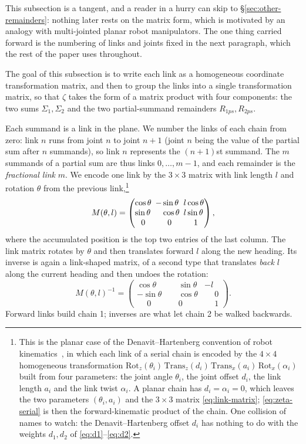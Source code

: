 \documentclass[11pt]{article}
\makeatletter
\theoremstyle{definition}
\newcommand{\linkmat}[2]{%
\left(\begin{array}{@{}l@{\ \,}l@{\ \,}l@{}}
\cos #1 & -\sin #1           & #2\cos #1\\
\sin #1 & \phantom{-}\cos #1 & #2\sin #1\\
\multicolumn{1}{@{}c@{\ \,}}{0} & \multicolumn{1}{c@{\ \,}}{0} & \multicolumn{1}{c@{}}{1}
\end{array}\right)}
\makeatother
\begin{document}
This subsection is a tangent, and a reader in a hurry can skip to
\S\ref{sec:other-remainders}: nothing later rests on the matrix form, which is
motivated by an analogy with multi-jointed planar robot manipulators. The one
thing carried forward is the numbering of links and joints fixed in the next
paragraph, which the rest of the paper uses throughout.

The goal of this subsection is to write each link
as a homogeneous coordinate transformation matrix, and then to group the
links into a single transformation matrix, so that $\zeta$ takes the form
of a matrix product with four components: the two sums $\Sigma_1,\Sigma_2$
and the two partial-summand remainders $R_{1ps},R_{2ps}$.

Each summand is a link in the plane. We number the
links of each chain from zero: link $n$ runs from joint $n$ to joint $n+1$
(joint $n$ being the value of the partial sum after $n$ summands), so link $n$
represents the $(n+1)$st summand. The $m$ summands of a partial sum are thus
links $0,\dots,m-1$, and each remainder is the \emph{fractional link} $m$. We
encode one link by the $3\times3$ matrix with link length $l$ and rotation
$\theta$ from the previous link,\footnote{This is the planar case of the
Denavit--Hartenberg convention of robot kinematics~\cite{DenavitHartenberg1955},
in which each link of a serial chain is encoded by the $4\times4$ homogeneous
transformation
$\mathrm{Rot}_z(\theta_i)\,\mathrm{Trans}_z(d_i)\,\mathrm{Trans}_x(a_i)\,
\mathrm{Rot}_x(\alpha_i)$
built from four parameters: the joint angle $\theta_i$, the joint offset $d_i$,
the link length $a_i$ and the link twist $\alpha_i$. A planar chain has
$d_i=\alpha_i=0$, which leaves the two parameters $(\theta_i,a_i)$ and the
$3\times3$ matrix \eqref{eq:link-matrix}; \eqref{eq:zeta-serial} is then the
forward-kinematic product of the chain. One collision of names to watch: the
Denavit--Hartenberg offset $d_i$ has nothing to do with the weights $d_1,d_2$ of
\eqref{eq:d1}--\eqref{eq:d2}.}
\begin{equation}\label{eq:link-matrix}
M(\theta,l)=\linkmat{\theta}{l},
\end{equation}
where the accumulated position is the top two entries of the last column.
The link matrix rotates by $\theta$ and then translates forward $l$
along the new heading. Its inverse is again a link-shaped matrix, of a
second type that translates \emph{back} $l$ along the current heading and
then undoes the rotation:
\begin{equation}\label{eq:link-matrix-2}
M(\theta,l)^{-1}=
\begin{pmatrix}
\cos\theta & \phantom{-}\sin\theta & -l\\
-\sin\theta & \phantom{-}\cos\theta & \phantom{-}0\\
\phantom{-}0 & \phantom{-}0 & \phantom{-}1
\end{pmatrix}.
\end{equation}
Forward links build chain 1; inverses are what let chain 2 be walked
backwards.
\end{document}

